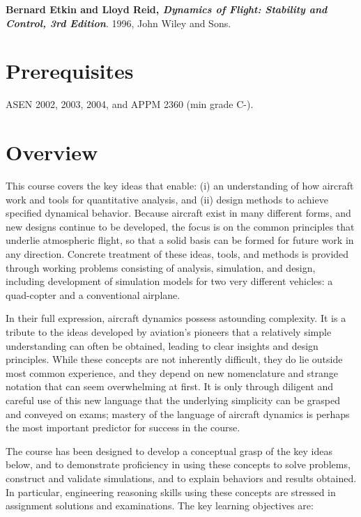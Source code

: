 \documentclass[9pt]{article}
\begin{document}
\textbf{Bernard Etkin and Lloyd Reid, \textit{Dynamics of Flight: Stability and Control, 3rd Edition}}. 1996, John Wiley and Sons.

\section*{Prerequisites}

ASEN 2002, 2003, 2004, and APPM 2360 (min grade C-).

\section*{Overview}

This course covers the key ideas that enable: (i) an understanding of
how aircraft work and tools for quantitative analysis, and (ii) design
methods to achieve specified dynamical behavior. Because aircraft exist
in many different forms, and new designs continue to be developed, the
focus is on the common principles that underlie atmospheric flight, so
that a solid basis can be formed for future work in any direction.
Concrete treatment of these ideas, tools, and methods is provided
through working problems consisting
of analysis, simulation, and design, including development of
simulation models for two very different vehicles: a quad-copter and a
conventional airplane.

In their full expression, aircraft dynamics possess astounding
complexity. It is a tribute to the ideas developed by aviation's
pioneers that a relatively simple understanding can often be obtained,
leading to clear insights and design principles. While these concepts
are not inherently difficult, they do lie outside most common
experience, and they depend on new nomenclature and strange notation
that can seem overwhelming at first. It is only through diligent and
careful use of this new language that the underlying simplicity can be
grasped and conveyed on exams; mastery of the language of aircraft
dynamics is perhaps the most important predictor for success in the
course.

The course has been designed to develop a conceptual grasp of the key
ideas below, and to demonstrate proficiency in using these concepts to
solve problems, construct and validate simulations, and to explain
behaviors and results obtained. In particular, engineering reasoning
skills using these concepts are stressed in assignment solutions and
examinations. The key learning objectives are:\\
\end{document}
